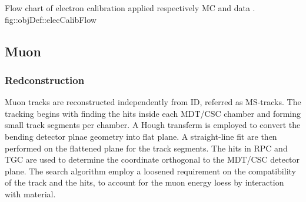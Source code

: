 
{Flow chart of electron calibration applied respectively MC and data \cite{161_egammaCalibRun1}.}
{fig::objDef::elecCalibFlow}




\subsection{Muon} \label{sec::objDef::muons}
\subsubsection{Redconstruction} \label{sec::objDef::muons::reco}
Muon tracks are reconstructed independently from ID, referred as MS-tracks. 
The tracking begins with finding the hits inside each MDT/CSC chamber and forming small track segments per chamber. A Hough transferm is employed to convert the bending detector plnae geometry into flat plane. A straight-line fit are then performed on the flattened plane for the track segments. 
The hits in RPC and TGC are used to determine the coordinate orthogonal to the MDT/CSC detector plane. The search algorithm employ a loosened requirement on the compatibility of the track and the hits, to account for the muon energy loess by interaction with material.

